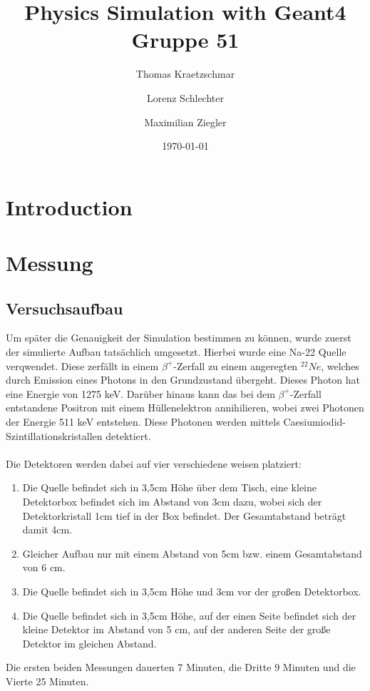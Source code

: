 \documentclass[a4paper,11pt,twoside]{article}
\title{%
{\Huge Physics Simulation with Geant4}\\[0.5\baselineskip]
{\normalsize Gruppe 51}
}
\author{%
Thomas Kraetzschmar
\and Lorenz Schlechter
\and Maximilian Ziegler
}
\date{\today}
\begin{document}
\pagestyle{fancy}
\maketitle
\clearpage
\tableofcontents
\clearpage
\pagestyle{fancy}
\section{Introduction}

\section{Messung}
\subsection{Versuchsaufbau}
Um später die Genauigkeit der Simulation bestimmen zu können, wurde zuerst der simulierte Aufbau tatsächlich umgesetzt. Hierbei wurde eine Na-22 Quelle verqwendet. Diese zerfällt in einem $\beta^+$-Zerfall zu einem angeregten $^{22}Ne$, welches durch Emission eines Photons in den Grundzustand übergeht. Dieses Photon hat eine Energie von 1275 keV. Darüber hinaus kann das bei  dem $\beta^+$-Zerfall entstandene Positron mit einem Hüllenelektron annihilieren, wobei zwei Photonen der Energie 511 keV entstehen.
Diese Photonen werden mittels Caesiumiodid-Szintillationskristallen detektiert. \\\\Die Detektoren werden dabei auf vier verschiedene weisen platziert:
\begin{enumerate}
\item Die Quelle befindet sich in 3,5cm Höhe über dem Tisch, eine kleine Detektorbox befindet sich im Abstand von 3cm dazu, wobei sich der Detektorkristall 1cm tief in der Box befindet. Der Gesamtabstand beträgt damit 4cm.
\item Gleicher Aufbau nur mit einem Abstand von 5cm bzw. einem Gesamtabstand von 6 cm.
\item Die Quelle befindet sich in 3,5cm Höhe und 3cm vor der großen Detektorbox.
\item Die Quelle befindet sich in 3,5cm Höhe, auf der einen Seite befindet sich der kleine Detektor im Abstand von 5 cm, auf der anderen Seite der große Detektor im gleichen Abstand.
\end{enumerate}
Die ersten beiden Messungen dauerten 7 Minuten, die Dritte 9 Minuten und die Vierte 25 Minuten.
\end{document}
